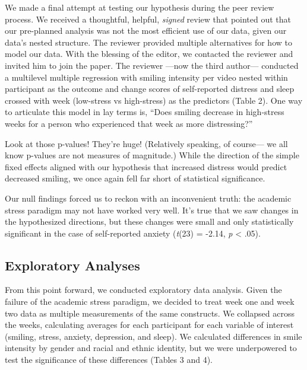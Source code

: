 \documentclass[authordate, empirical]{jote-new-article}
\begin{document}
We made a final attempt at testing our hypothesis during the peer review process. We received a thoughtful, helpful, \emph{signed }review that pointed out that our pre-planned analysis was not the most efficient use of our data, given our data's nested structure. The reviewer provided multiple alternatives for how to model our data. With the blessing of the editor, we contacted the reviewer and invited him to join the paper. The reviewer —now the third author— conducted a multilevel multiple regression with smiling intensity per video nested within participant as the outcome and change scores of self-reported distress and sleep crossed with week (low-stress vs high-stress) as the predictors (Table 2). One way to articulate this model in lay terms is, ``Does smiling decrease in high-stress weeks for a person who experienced that week as more distressing?”













Look at those p-values! They're huge! (Relatively speaking, of course— we all know p-values are not measures of magnitude.) While the direction of the simple fixed effects aligned with our hypothesis that increased distress would predict decreased smiling, we once again fell far short of statistical significance.



Our null findings forced us to reckon with an inconvenient truth: the academic stress paradigm may not have worked very well. It's true that we saw changes in the hypothesized directions, but these changes were small and only statistically significant in the case of self-reported anxiety (\emph{t}(23) = -2.14, \emph{p} < .05).








\subsection{Exploratory Analyses}



From this point forward, we conducted exploratory data analysis. Given the failure of the academic stress paradigm, we decided to treat week one and week two data as multiple measurements of the same constructs. We collapsed across the weeks, calculating averages for each participant for each variable of interest (smiling, stress, anxiety, depression, and sleep). We calculated differences in smile intensity by gender and racial and ethnic identity, but we were underpowered to test the significance of these differences (Tables 3 and 4).
\end{document}
